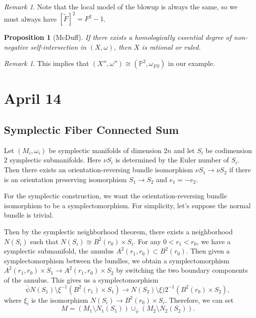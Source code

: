 \documentclass[leqno, openany]{memoir}
\newtheorem{prop}[thm]{Proposition}
\theoremstyle{definition}
\theoremstyle{remark}
\newtheorem{rmk}[thm]{Remark}
\theoremstyle{plain}
\theoremstyle{definition}
\theoremstyle{remark}
\renewcommand{\P}{\mathbb{P}}
\newcommand{\wt}[1]{\widetilde{#1}}
\begin{document}
    \begin{rmk}
        Note that the local model of the blowup is always the same, so we must always have $[\wt{F}]^2 = F^2 - 1$.
    \end{rmk}

    \begin{prop}[McDuff]
        If there exists a homologically essential degree of non-negative self-intersection in $(X, \omega)$, then $X$ is rational or ruled.
    \end{prop}

    \begin{rmk}
        This implies that $(X'', \omega'') \cong (\P^2, \omega_{FS})$ in our example.
    \end{rmk}

    \chapter{April 14}%
    \label{cha:april_14}
    
    \section{Symplectic Fiber Connected Sum}%
    \label{sec:symplectic_fiber_connected_sum}
    
    Let $(M_i, \omega_i)$ be symplectic manifolds of dimension $2n$ and let $S_i$ be codimension $2$ symplectic submanifolds. Here $\nu S_i$ is determined by the Euler number of $S_i$. Then there exists an orientation-reversing bundle isomorphism $\nu S_1 \to \nu S_2$ if there is an orientation preserving isomorphism $S_1 \to S_2$ and $e_1 = - e_2$. 

    For the symplectic construction, we want the orientation-reversing bundle isomorphism to be a symplectomorphism. For simplicity, let's suppose the normal bundle is trivial. 

    Then by the symplectic neighborhood theorem, there exists a neighborhood $N(S_i)$ such that $N(S_i) \cong B^2(r_0) \times S_i$. For any $0 < r_1 < r_0$, we have a symplectic submanifold, the annulus $A^2(r_1,r_0) \subset B^2(r_0)$. Then given a symplectomorphism between the bundles, we obtain a symplectomorphism $A^2(r_1, r_0) \times S_1 \to A^2(r_1,r_0) \times S_2$ by switching the two boundary components of the annulus. This gives us a symplectomorphism
    \[ \overline{\psi} N(S_1) \setminus \xi^{-1}(B^2(r_1) \times S_1) \to N(S_2) \setminus \xi)2^{-1}(B^2(r_0) \times S_2), \]
    where $\xi_i$ is the isomorphism $N(S_i) \to B^2(r_0) \times S_i$. Therefore, we can set
    \[ M = (M_1 \setminus N_1(S_1)) \cup_{\overline{\psi}} (M_2 \setminus N_2(S_2)). \]
\end{document}
